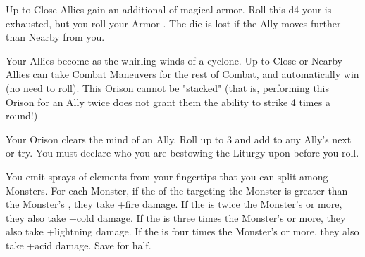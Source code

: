 \begin{multicols*}{2}

\newpage




\LITURGY [
  Name = Bastion,
  Link = arcana-mystery-aura-protection,
  Paradigm = Civilized,
  Duration=1 Combat Action
]

Up to \DICE Close Allies gain an additional  of magical armor. Roll this d4  your  is exhausted, but  you roll your Armor \UD. The die is lost if the Ally moves further than Nearby from you.

\LITURGY [
  Name = Dervish,
  Link = arcana-mystery-dervish,
  Paradigm = Empyrean,
  Duration=1 Combat Action
]

Your Allies become as the whirling winds of a cyclone. Up to \DICE Close or Nearby Allies can take  Combat Maneuvers for the rest of Combat, 
and automatically win  (no need to roll).  This Orison cannot be "stacked" (that is, performing this Orison for an Ally twice does not grant them the ability to strike 4 times a round!)

\LITURGY [
  Name = Divine Inspiration,
  Link = arcana-mystery-divine-inspiration,
  Paradigm = Cunning,
  Duration=1 Combat Action
]

Your Orison clears the mind of an Ally. Roll up to 3 \DICE and add \SUMDICE to any Ally's next \INT or \FOC try. You must declare who you are bestowing the Liturgy upon before you roll.

\LITURGY [
  Name = Elemental Spray,
  Link = arcana-mystery-elemental-spray,
  Paradigm = Heathen,
  Duration=1 Combat Action
]

You emit \DICE sprays of elements from your fingertips that you can split among \DICE Monsters.  For each Monster, if the \SUMDICE of the \DICE targeting the Monster is greater than the Monster's \HD, they take \DICE+\DICE fire damage.  If the \SUMDICE is twice the Monster's \HD or more, they also take \DICE+\DICE cold damage.  If the \SUMDICE is three times the Monster's \HD or more, they also take \DICE+\DICE lightning damage.  If the \SUMDICE is four times the Monster's \HD or more, they also take \DICE+\DICE acid damage.  Save for half.


\end{multicols*}
